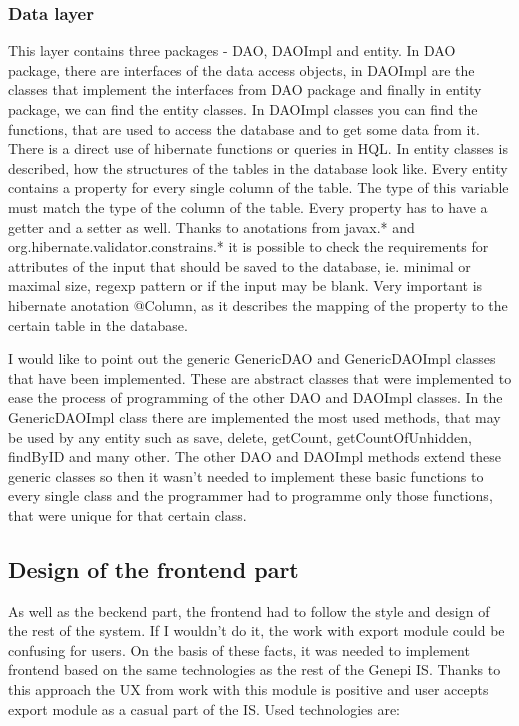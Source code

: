 \documentclass[thesis=B,english]{FITthesis}[2012/10/20]
\begin{document}
\subsubsection{Data layer}
This layer contains three packages - DAO, DAOImpl and entity. In DAO package, there are interfaces of the data access objects, in DAOImpl are the classes that implement the interfaces from DAO package and finally in entity package, we can find the entity classes.
In DAOImpl classes you can find the functions, that are used to access the database and to get some data from it. There is a direct use of hibernate functions or queries in HQL.
In entity classes is described, how the structures of the tables in the database look like. Every entity contains a property for every single column of the table. The type of this variable must match the type of the column of the table. Every property has to have a getter and a setter as well. Thanks to anotations from javax.* and org.hibernate.validator.constrains.* it is possible to check the requirements for attributes of the input that should be saved to the database, ie. minimal or maximal size, regexp pattern or if the input may be blank. Very important is hibernate anotation @Column, as it describes the mapping of the property to the certain table in the database.

I would like to point out the generic GenericDAO and GenericDAOImpl classes that have been implemented.
These are abstract classes that were implemented to ease the process of programming of the other DAO and DAOImpl classes. In the GenericDAOImpl class there are implemented the most used methods, that may be used by any entity such as save, delete, getCount, getCountOfUnhidden, findByID and many other. The other DAO and DAOImpl methods extend these generic classes so then it wasn't needed to implement these basic functions to every single class and the programmer had to programme only those functions, that were unique for that certain class.

\subsection{Design of the frontend part}
As well as the beckend part, the frontend had to follow the style and design of the rest of the system. If I wouldn't do it, the work with export module could be confusing for users. On the basis of these facts, it was needed to implement frontend based on the same technologies as the rest of the Genepi IS. Thanks to this approach the UX from work with this module is positive and user accepts export module as a casual part of the IS.
Used technologies are:
\end{document}
